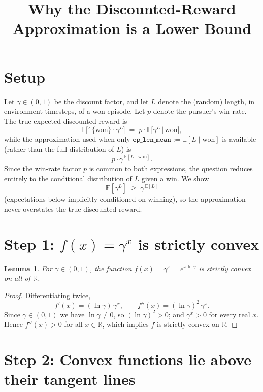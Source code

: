 \documentclass[11pt]{article}
\title{Why the Discounted-Reward Approximation is a Lower Bound}
\author{}
\date{}
\newtheorem{lemma}{Lemma}
\theoremstyle{remark}
\begin{document}
\maketitle

\section*{Setup}

Let $\gamma \in (0,1)$ be the discount factor, and let $L$ denote the (random) length,
in environment timesteps, of a won episode. Let $p$ denote the pursuer's win rate.
The true expected discounted reward is
\[
  \mathbb{E}\big[\mathbb{1}\{\text{won}\}\cdot \gamma^{L}\big]
  \;=\; p \cdot \mathbb{E}\big[\gamma^{L} \,\big|\, \text{won}\big],
\]
while the approximation used when only $\texttt{ep\_len\_mean} := \mathbb{E}[L \mid \text{won}]$
is available (rather than the full distribution of $L$) is
\[
  p \cdot \gamma^{\,\mathbb{E}[L\mid\text{won}]}.
\]
Since the win-rate factor $p$ is common to both expressions, the question reduces
entirely to the conditional distribution of $L$ given a win. We show
\begin{equation}
  \mathbb{E}[\gamma^{L}] \;\ge\; \gamma^{\,\mathbb{E}[L]} \tag{$\star$}
\end{equation}
(expectations below implicitly conditioned on winning), so the approximation never
overstates the true discounted reward.

\section*{Step 1: $f(x) = \gamma^x$ is strictly convex}

\begin{lemma}
For $\gamma \in (0,1)$, the function $f(x) = \gamma^{x} = e^{x\ln\gamma}$ is strictly
convex on all of $\mathbb{R}$.
\end{lemma}

\begin{proof}
Differentiating twice,
\[
  f'(x) = (\ln\gamma)\,\gamma^{x}, \qquad
  f''(x) = (\ln\gamma)^{2}\,\gamma^{x}.
\]
Since $\gamma \in (0,1)$ we have $\ln\gamma \neq 0$, so $(\ln\gamma)^2 > 0$; and
$\gamma^{x} > 0$ for every real $x$. Hence $f''(x) > 0$ for all $x \in \mathbb{R}$,
which implies $f$ is strictly convex on $\mathbb{R}$.
\end{proof}

\section*{Step 2: Convex functions lie above their tangent lines}
\end{document}
